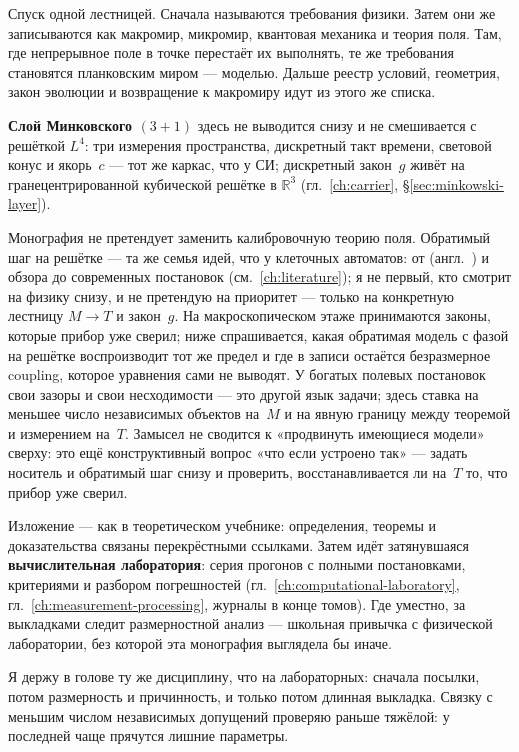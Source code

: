 Спуск одной лестницей.
Сначала называются требования физики.
Затем они же записываются как макромир, микромир, квантовая механика и теория поля.
Там, где непрерывное поле в точке перестаёт их выполнять, те же требования становятся планковским миром --- моделью.
Дальше реестр условий, геометрия, закон эволюции и возвращение к макромиру идут из этого же списка.

\medskip
\noindent
\textbf{Слой Минковского $(3{+}1)$} здесь не выводится снизу и не смешивается с решёткой $L^4$:
три измерения пространства, дискретный такт времени, световой конус и якорь~$c$ --- тот же каркас, что у СИ;
дискретный закон~$g$ живёт на гранецентрированной кубической решётке в $\mathbb{R}^3$
(гл.~\ref{ch:carrier}, \S\ref{sec:minkowski-layer}).

\medskip
\noindent
Монография не претендует заменить калибровочную теорию поля.
Обратимый шаг на решётке --- та же семья идей, что у клеточных автоматов: от \textcite{zuse1969}
(англ.\ \textcite{zuse2012zenil}) и обзора \textcite{bandman2006} до современных постановок (см.\ \cref{ch:literature});
я не первый, кто смотрит на физику снизу, и не претендую на приоритет --- только на конкретную лестницу $M\to T$ и закон~$g$.
На макроскопическом этаже принимаются законы, которые прибор уже сверил; ниже спрашивается, какая обратимая модель с фазой на решётке воспроизводит тот же предел
и где в записи остаётся безразмерное coupling, которое уравнения сами не выводят.
У богатых полевых постановок свои зазоры и свои несходимости --- это другой язык задачи;
здесь ставка на меньшее число независимых объектов на~$M$ и на явную границу между теоремой и измерением на~$T$.
Замысел не сводится к «продвинуть имеющиеся модели» сверху: это ещё конструктивный вопрос «что если устроено так» ---
задать носитель и обратимый шаг снизу и проверить, восстанавливается ли на~$T$ то, что прибор уже сверил.

Изложение --- как в теоретическом учебнике: определения, теоремы и доказательства
связаны перекрёстными ссылками.
Затем идёт затянувшаяся \textbf{вычислительная лаборатория}: серия прогонов с полными постановками,
критериями и разбором погрешностей (гл.~\ref{ch:computational-laboratory}, гл.~\ref{ch:measurement-processing},
журналы в конце томов).
Где уместно, за выкладками следит размерностной анализ --- школьная привычка
с физической лаборатории, без которой эта монография выглядела бы иначе.

\medskip
\noindent
Я держу в голове ту же дисциплину, что на лабораторных: сначала посылки,
потом размерность и причинность, и только потом длинная выкладка.
Связку с меньшим числом независимых допущений проверяю раньше тяжёлой:
у последней чаще прячутся лишние параметры.

